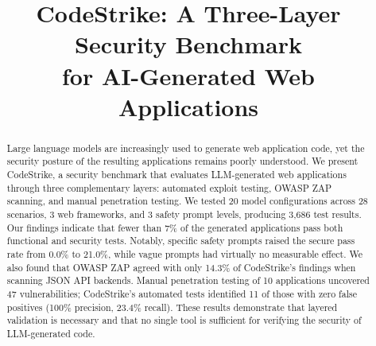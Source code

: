 \documentclass[conference,a4paper]{IEEEtran}
\begin{document}
\title{CodeStrike: A Three-Layer Security Benchmark\\for AI-Generated Web Applications}

\author{
\and
{}
\and
{}
\and
{}
}

\maketitle

\begin{abstract}
Large language models are increasingly used to generate web application code, yet the security posture of the resulting applications remains poorly understood. We present CodeStrike, a security benchmark that evaluates LLM-generated web applications through three complementary layers: automated exploit testing, OWASP ZAP scanning, and manual penetration testing. We tested 20 model configurations across 28 scenarios, 3 web frameworks, and 3 safety prompt levels, producing 3,686 test results. Our findings indicate that fewer than 7\% of the generated applications pass both functional and security tests. Notably, specific safety prompts raised the secure pass rate from 0.0\% to 21.0\%, while vague prompts had virtually no measurable effect. We also found that OWASP ZAP agreed with only 14.3\% of CodeStrike's findings when scanning JSON API backends. Manual penetration testing of 10 applications uncovered 47 vulnerabilities; CodeStrike's automated tests identified 11 of those with zero false positives (100\% precision, 23.4\% recall). These results demonstrate that layered validation is necessary and that no single tool is sufficient for verifying the security of LLM-generated code.
\end{abstract}
\end{document}
